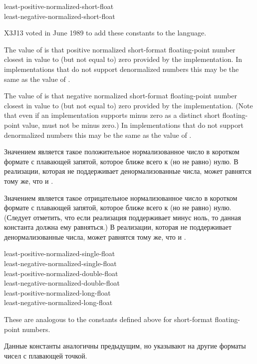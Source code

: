 \begin{newer}
\begin{defun}[Constant]
least-positive-normalized-short-float \\
least-negative-normalized-short-float

X3J13 voted in June 1989 
to add these constants to the language.

The value of  is that positive normalized
short-format
floating-point number closest in value to (but not equal to) zero provided by
the implementation.  In implementations that do not support denormalized numbers
this may be the same as the value of
.

The value of  is that negative normalized short-format
floating-point number closest in value to (but not equal to) zero provided by
the implementation.
(Note that even if an implementation supports
minus zero as a distinct short floating-point value,
 must not be minus zero.)
In implementations that do not support denormalized numbers
this may be the same as the value of .

Значением  является такое
положительное нормализованное число в коротком формате с плавающей запятой,
которое ближе всего к (но не равно) нулю. В реализации, которая не поддерживает
денормализованные числа, может равнятся тому же, что и
. 

Значением  является такое
отрицательное нормализованное число в коротком формате с плавающей запятой,
которое ближе всего к (но не равно) нулю. 
(Следует отметить, что если реализация поддерживает минус ноль, то данная
константа должна ему равняться.)
В реализации, которая не поддерживает
денормализованные числа, может равнятся тому же, что и
. 
\end{defun}

\begin{defun}[Constant]
least-positive-normalized-single-float \\
least-negative-normalized-single-float \\
least-positive-normalized-double-float \\
least-negative-normalized-double-float \\
least-positive-normalized-long-float \\
least-negative-normalized-long-float

These are analogous to the constants defined above for short-format
floating-point numbers.

Данные константы аналогичны предыдущим, но указывают на другие форматы чисел с
плавающей точкой.
\end{defun}
\end{newer}

